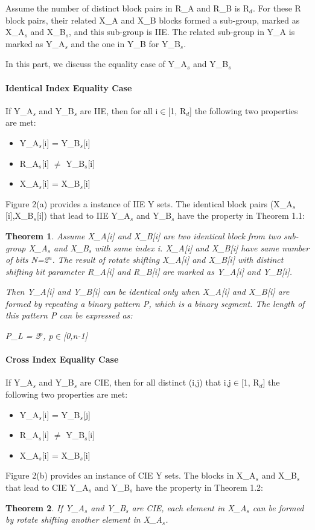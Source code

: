 \documentclass{article}
\newtheorem{theorem}{Theorem}[section]
\begin{document}
Assume the number of distinct block pairs in R\_A and R\_B is R$_d$. For these R block pairs, their related X\_A and X\_B blocks formed a sub-group, marked as X\_A$_s$ and X\_B$_s$, and this sub-group is IIE. The related sub-group in Y\_A is marked as Y\_A$_s$ and the one in Y\_B for Y\_B$_s$.

In this part, we discuss the equality case of Y\_A$_s$ and Y\_B$_s$
\paragraph{Identical Index Equality Case}
If Y\_A$_s$ and Y\_B$_s$ are IIE, then for all i$\in$[1, R$_d$] the following two properties are met:
\begin{itemize}
	\item Y\_A$_s$[i] = Y\_B$_s$[i] 
	\item R\_A$_s$[i] $\neq$ Y\_B$_s$[i]
	\item X\_A$_s$[i] = X\_B$_s$[i]
\end{itemize}
Figure 2(a) provides a instance of IIE Y sets.
The identical block pairs (X\_A$_s$[i],X\_B$_s$[i]) that lead to IIE Y\_A$_s$ and Y\_B$_s$ have the property in Theorem 1.1:
\begin{theorem}
Assume X\_A[i] and X\_B[i] are two identical block from two sub-group X\_A$_s$ and X\_B$_s$ with same index i. X\_A[i] and X\_B[i] have same number of bits N=2$^n$. The result of rotate shifting X\_A[i] and X\_B[i] with distinct shifting bit parameter R\_A[i] and R\_B[i] are marked as Y\_A[i] and Y\_B[i]. 

Then Y\_A[i] and Y\_B[i] can be identical only when X\_A[i] and X\_B[i] are formed by repeating a binary pattern P, which is a binary segment. The length of this pattern P can be expressed as:

	P\_L = 2$^p$, p$\in$[0,n-1]
\end{theorem}

\paragraph{Cross Index Equality Case}
If Y\_A$_s$ and Y\_B$_s$ are CIE, then for all distinct (i,j) that i,j$\in$[1, R$_d$] the following two properties are met:
\begin{itemize}
	\item Y\_A$_s$[i] = Y\_B$_s$[j] 
	\item R\_A$_s$[i] $\neq$ Y\_B$_s$[i]
	\item X\_A$_s$[i] = X\_B$_s$[i]
\end{itemize}
Figure 2(b) provides an instance of CIE Y sets.
The blocks in X\_A$_s$ and X\_B$_s$ that lead to CIE Y\_A$_s$ and Y\_B$_s$ have the property in Theorem 1.2:
\begin{theorem}
If Y\_A$_s$ and Y\_B$_s$ are CIE, each element in X\_A$_s$ can be formed by rotate shifting another element in X\_A$_s$.
\end{theorem}
\end{document}

